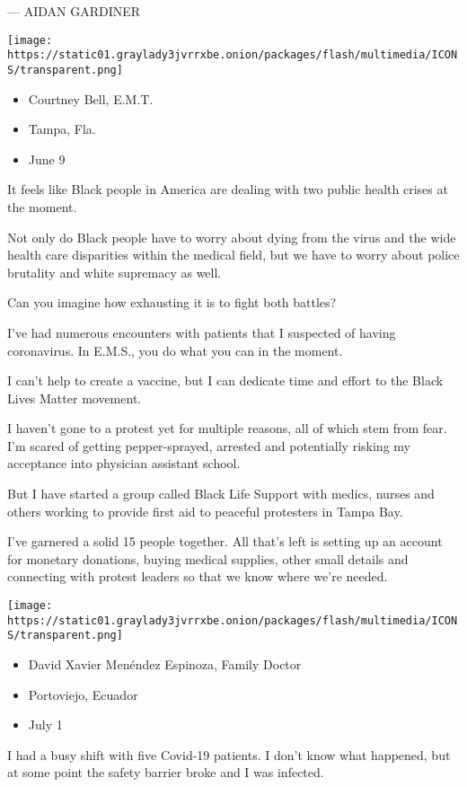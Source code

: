 --- AIDAN GARDINER

\texttt{[image: https://static01.graylady3jvrrxbe.onion/packages/flash/multimedia/ICONS/transparent.png]}

\begin{itemize}
\tightlist
\item
  Courtney Bell, E.M.T.
\item
  Tampa, Fla.
\item
  June 9
\end{itemize}

It feels like Black people in America are dealing with two public health
crises at the moment.

Not only do Black people have to worry about dying from the virus and
the wide health care disparities within the medical field, but we have
to worry about police brutality and white supremacy as well.

Can you imagine how exhausting it is to fight both battles?

I've had numerous encounters with patients that I suspected of having
coronavirus. In E.M.S., you do what you can in the moment.

I can't help to create a vaccine, but I can dedicate time and effort to
the Black Lives Matter movement.

I haven't gone to a protest yet for multiple reasons, all of which stem
from fear. I'm scared of getting pepper-sprayed, arrested and
potentially risking my acceptance into physician assistant school.

But I have started a group called Black Life Support with medics, nurses
and others working to provide first aid to peaceful protesters in Tampa
Bay.

I've garnered a solid 15 people together. All that's left is setting up
an account for monetary donations, buying medical supplies, other small
details and connecting with protest leaders so that we know where we're
needed.

\texttt{[image: https://static01.graylady3jvrrxbe.onion/packages/flash/multimedia/ICONS/transparent.png]}

\begin{itemize}
\tightlist
\item
  David Xavier Menéndez Espinoza, Family Doctor
\item
  Portoviejo, Ecuador
\item
  July 1
\end{itemize}

I had a busy shift with five Covid-19 patients. I don't know what
happened, but at some point the safety barrier broke and I was infected.

